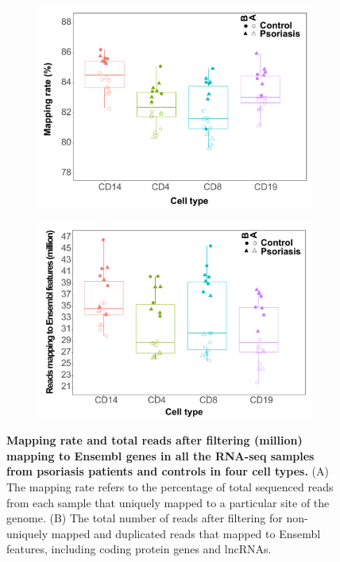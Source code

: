 \begin{figure}[htbp]
\centering
\begin{subfigure}{0.45\textwidth}
\centering
\includegraphics[width=\textwidth]{./Appendix/pdfs/Chapter4/PS_CTL_RNAseq_uniquely_mapped_reads_rate_cell_type_batch_and_condition_boxplots}
\caption{\textbf{}}
\end{subfigure}%
\begin{subfigure}{0.45\textwidth}
\centering
\includegraphics[width=\textwidth]{./Appendix/pdfs/Chapter4/PS_CTL_RNAseq_total_reads_per_batch_cell_type_and_condition}
\caption{\textbf{}}
\end{subfigure}
\caption[Mapping rate and total reads after filtering (million) mapping to Ensembl genes in all the RNA-seq samples from psoriasis patients and controls in four cell types.]{\textbf{Mapping rate and total reads after filtering (million) mapping to Ensembl genes in all the RNA-seq samples from psoriasis patients and controls in four cell types.} (A) The mapping rate refers to the percentage of total sequenced reads from each sample that uniquely mapped to a particular site of the genome. (B) The total number of reads after filtering for non-uniquely mapped and duplicated reads that mapped to Ensembl features, including coding protein genes and lncRNAs.}
\label{figure:RNAseq_mapping_rate_and_reads_in_genes}
\end{figure} 


